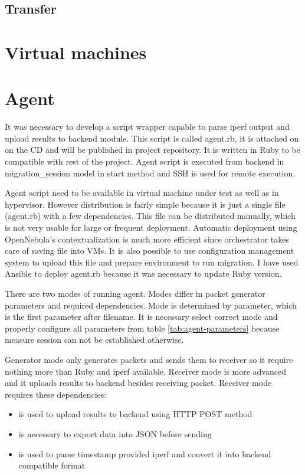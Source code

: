\subsection{Transfer}



\section{Virtual machines}

\section{Agent}
It was necessary to develop a script wrapper capable to parse iperf output and upload results to backend module. This script is called agent.rb, it is attached on on the CD and will be published in project repository. It is written in Ruby to be compatible with rest of the project. Agent script is executed from backend in migration\_session model in start method and \Ac{SSH} is used for remote execution.

Agent script need to be available in virtual machine under test as well as in hypervisor. However distribution is fairly simple because it is just a single file (agent.rb) with a few dependencies. This file can be distributed manually, which is not very usable for large or frequent deployment. Automatic deployment using OpenNebula's contextualization is much more efficient since orchestrator takes care of saving file into \Ac{VM}s. 
It is also possible to use configuration management system to upload this file and prepare environment to run migration. I have used Ansible to deploy agent.rb because it was necessary to update Ruby version. 

There are two modes of running agent. Modes differ in packet generator parameters and required dependencies. Mode is determined by  parameter, which is the first parameter after filename. It is necessary select correct mode and properly configure all parameters from table \ref{tab:agent-parameters} because measure session can not be established otherwise. 

Generator mode only generates packets and sends them to receiver so it require nothing more than Ruby and iperf available. Receiver mode is more advanced and it uploads results to backend besides receiving packet. Receiver mode requires these dependencies:
\begin{itemize}
	\item {} is used to upload results to backend using \Ac{HTTP} POST method
	\item {} is necessary to export data into \Ac{JSON} before sending
	\item {} is used to parse timestamp provided iperf and convert it into backend compatible format
\end{itemize}

